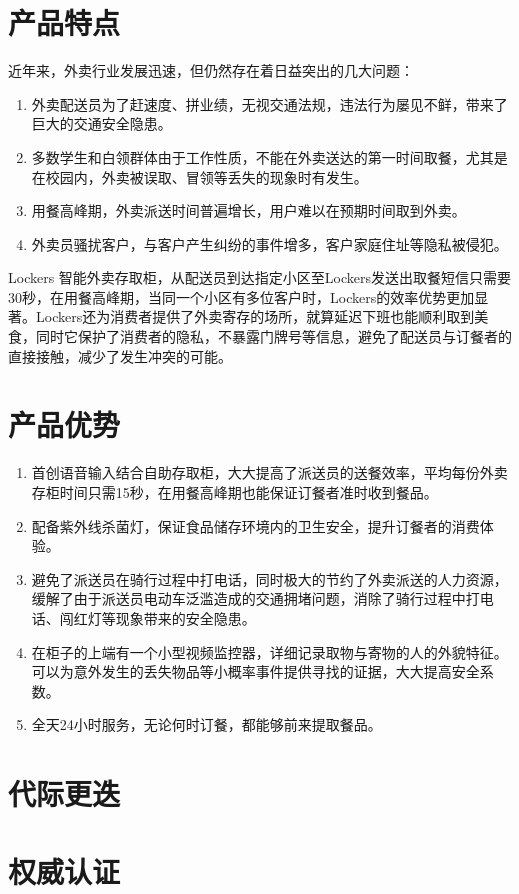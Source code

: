 \documentclass[violet]{main}
\begin{document}
		\section{产品特点}
			近年来，外卖行业发展迅速，但仍然存在着日益突出的几大问题：
			\begin{enumerate}
				\item 外卖配送员为了赶速度、拼业绩，无视交通法规，违法行为屡见不鲜，带来了巨大的交通安全隐患。
				\item 多数学生和白领群体由于工作性质，不能在外卖送达的第一时间取餐，尤其是在校园内，外卖被误取、冒领等丢失的现象时有发生。
				\item 用餐高峰期，外卖派送时间普遍增长，用户难以在预期时间取到外卖。
				\item 外卖员骚扰客户，与客户产生纠纷的事件增多，客户家庭住址等隐私被侵犯。
			\end{enumerate}
			\par Lockers 智能外卖存取柜，从配送员到达指定小区至Lockers发送出取餐短信只需要30秒，在用餐高峰期，当同一个小区有多位客户时，Lockers的效率优势更加显著。Lockers还为消费者提供了外卖寄存的场所，就算延迟下班也能顺利取到美食，同时它保护了消费者的隐私，不暴露门牌号等信息，避免了配送员与订餐者的直接接触，减少了发生冲突的可能。
		\section{产品优势}
			\begin{enumerate}
				\item 首创语音输入结合自助存取柜，大大提高了派送员的送餐效率，平均每份外卖存柜时间只需15秒，在用餐高峰期也能保证订餐者准时收到餐品。
				\item 配备紫外线杀菌灯，保证食品储存环境内的卫生安全，提升订餐者的消费体验。
				\item 避免了派送员在骑行过程中打电话，同时极大的节约了外卖派送的人力资源，缓解了由于派送员电动车泛滥造成的交通拥堵问题，消除了骑行过程中打电话、闯红灯等现象带来的安全隐患。
				\item 在柜子的上端有一个小型视频监控器，详细记录取物与寄物的人的外貌特征。可以为意外发生的丢失物品等小概率事件提供寻找的证据，大大提高安全系数。
				\item 全天24小时服务，无论何时订餐，都能够前来提取餐品。
			\end{enumerate}
		\section{代际更迭}
		\section{权威认证}
\end{document}
